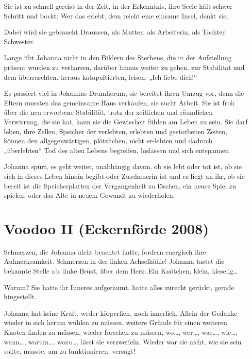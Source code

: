 \documentclass[10pt,titlepage,a5paper]{book}
\begin{document}
Sie ist zu schnell gereist in der Zeit, in der Erkenntnis, ihre Seele hält schwer Schritt und bockt. Wer das erlebt, dem reicht eine einsame Insel, denkt sie.

Dabei wird sie gebraucht Draussen, als Mutter, als Arbeiterin, als Tochter, Schwester.

Lange übt Johanna nicht in den Bildern des Sterbens, die in der Aufstellung präsent wurden zu verharren, darüber hinaus weiter zu gehen, zur Stabilität und dem überraschten, heraus katapultierten, leisen: „Ich liebe dich!“

Es passiert viel in Johannas Drumherum, sie bereitet ihren Umzug vor, denn die Eltern mussten das gemeinsame Haus verkaufen, sie sucht Arbeit. Sie ist froh über die neu erworbene Stabilität, trotz der zeitlichen und räumlichen Verwirrung, die sie hat, kann sie die Gewissheit fühlen am Leben zu sein. Sie darf leben, ihre Zellen, Speicher der verlebten, erlebten und gestorbenen Zeiten, können den allgegenwärtigen, plötzlichen, nicht er-lebten und dadurch „überlebten“ Tod des alten Lebens begreifen, loslassen und sich entspannen.

Johanna spürt, es geht weiter, unabhängig davon, ob sie lebt oder tot ist, ob sie sich in dieses Leben hinein begibt oder Zuschauerin ist und es liegt an ihr, ob sie bereit ist die Speicherplatten der Vergangenheit zu löschen, ein neues Spiel zu spielen, oder das Alte in neuem Gewandt zu wiederholen.



\section*{Voodoo II (Eckernförde 2008)}




Schmerzen, die Johanna nicht beachtet hatte, fordern energisch ihre Aufmerksamkeit. Schmerzen in der linken Achselhöhle! Johanna tastet die bekannte Stelle ab, linke Brust, über dem Herz: Ein Knötchen, klein, kieselig\dots 

Warum? Sie hatte ihr Inneres aufgeräumt, hatte alles zurecht ge\-rückt, gerade hingestellt.

Johanna hat keine Kraft, weder körperlich, noch innerlich. Allein der Gedanke wieder in sich herum wühlen zu müssen, weitere Gründe für einen weiteren Knoten finden zu müssen, wieder forschen zu müssen, wo\dots , wer\dots , was\dots , wie\dots , wann\dots , warum\dots , wozu\dots , lässt sie verzweifeln. Wieder war sie nicht, wie sie sein sollte, musste, um zu funktionieren; versagt!
\end{document}
